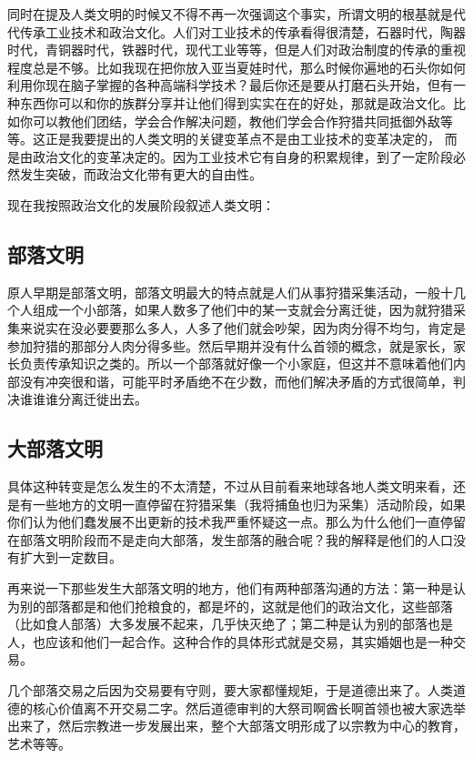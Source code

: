 \documentclass[11pt,oneside]{article}
\begin{document}
同时在提及人类文明的时候又不得不再一次强调这个事实，所谓文明的根基就是代代传承工业技术和政治文化。人们对工业技术的传承看得很清楚，石器时代，陶器时代，青铜器时代，铁器时代，现代工业等等，但是人们对政治制度的传承的重视程度总是不够。比如我现在把你放入亚当夏娃时代，那么时候你遍地的石头你如何利用你现在脑子掌握的各种高端科学技术？最后你还是要从打磨石头开始，但有一种东西你可以和你的族群分享并让他们得到实实在在的好处，那就是政治文化。比如你可以教他们团结，学会合作解决问题，教他们学会合作狩猎共同抵御外敌等等。这正是我要提出的人类文明的关键变革点不是由工业技术的变革决定的， 而是由政治文化的变革决定的。因为工业技术它有自身的积累规律，到了一定阶段必然发生突破，而政治文化带有更大的自由性。

现在我按照政治文化的发展阶段叙述人类文明：
\subsection{部落文明}
\label{sec-7-1}
原人早期是部落文明，部落文明最大的特点就是人们从事狩猎采集活动，一般十几个人组成一个小部落，如果人数多了他们中的某一支就会分离迁徙，因为就狩猎采集来说实在没必要要那么多人，人多了他们就会吵架，因为肉分得不均匀，肯定是参加狩猎的那部分人肉分得多些。然后早期并没有什么首领的概念，就是家长，家长负责传承知识之类的。所以一个部落就好像一个小家庭，但这并不意味着他们内部没有冲突很和谐，可能平时矛盾绝不在少数，而他们解决矛盾的方式很简单，判决谁谁谁分离迁徙出去。

\subsection{大部落文明}
\label{sec-7-2}
具体这种转变是怎么发生的不太清楚，不过从目前看来地球各地人类文明来看，还是有一些地方的文明一直停留在狩猎采集（我将捕鱼也归为采集）活动阶段，如果你们认为他们蠢发展不出更新的技术我严重怀疑这一点。那么为什么他们一直停留在部落文明阶段而不是走向大部落，发生部落的融合呢？我的解释是他们的人口没有扩大到一定数目。

再来说一下那些发生大部落文明的地方，他们有两种部落沟通的方法：第一种是认为别的部落都是和他们抢粮食的，都是坏的，这就是他们的政治文化，这些部落（比如食人部落）大多发展不起来，几乎快灭绝了；第二种是认为别的部落也是人，也应该和他们一起合作。这种合作的具体形式就是交易，其实婚姻也是一种交易。

几个部落交易之后因为交易要有守则，要大家都懂规矩，于是道德出来了。人类道德的核心价值离不开交易二字。然后道德审判的大祭司啊酋长啊首领也被大家选举出来了，然后宗教进一步发展出来，整个大部落文明形成了以宗教为中心的教育，艺术等等。
\end{document}
